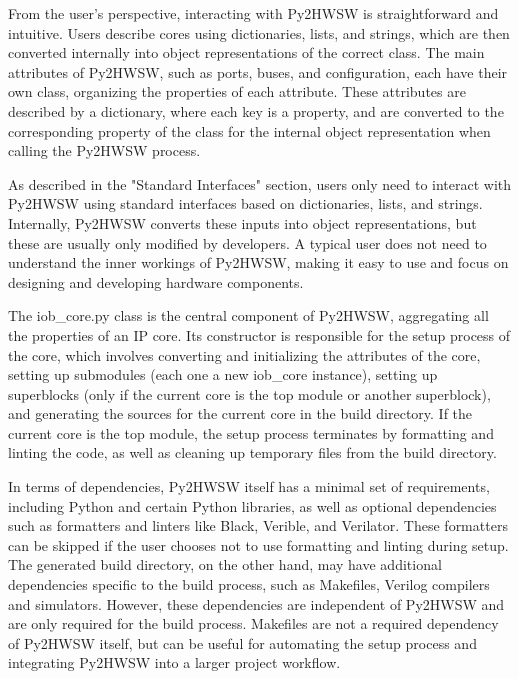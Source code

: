 %


From the user's perspective, interacting with Py2HWSW is straightforward and intuitive. Users describe cores using dictionaries, lists, and strings, which are then converted internally into object representations of the correct class. The main attributes of Py2HWSW, such as ports, buses, and configuration, each have their own class, organizing the properties of each attribute. These attributes are described by a dictionary, where each key is a property, and are converted to the corresponding property of the class for the internal object representation when calling the Py2HWSW process.

As described in the "Standard Interfaces" section, users only need to interact with Py2HWSW using standard interfaces based on dictionaries, lists, and strings. Internally, Py2HWSW converts these inputs into object representations, but these are usually only modified by developers. A typical user does not need to understand the inner workings of Py2HWSW, making it easy to use and focus on designing and developing hardware components.

The iob\_core.py class is the central component of Py2HWSW, aggregating all the properties of an IP core. Its constructor is responsible for the setup process of the core, which involves converting and initializing the attributes of the core, setting up submodules (each one a new iob\_core instance), setting up superblocks (only if the current core is the top module or another superblock), and generating the sources for the current core in the build directory. If the current core is the top module, the setup process terminates by formatting and linting the code, as well as cleaning up temporary files from the build directory.

In terms of dependencies, Py2HWSW itself has a minimal set of requirements, including Python and certain Python libraries, as well as optional dependencies such as formatters and linters like Black, Verible, and Verilator. These formatters can be skipped if the user chooses not to use formatting and linting during setup. The generated build directory, on the other hand, may have additional dependencies specific to the build process, such as Makefiles, Verilog compilers and simulators. However, these dependencies are independent of Py2HWSW and are only required for the build process. Makefiles are not a required dependency of Py2HWSW itself, but can be useful for automating the setup process and integrating Py2HWSW into a larger project workflow. 
